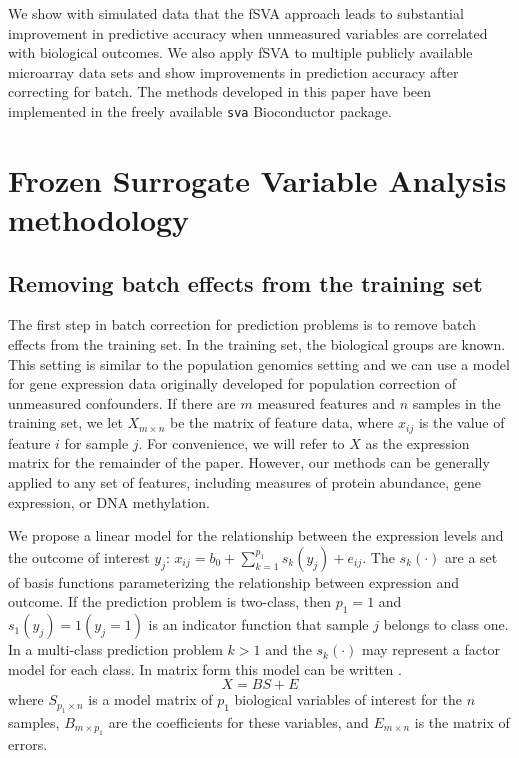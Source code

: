 \documentclass{bioinfo}
\begin{document}
We show with simulated data that the fSVA approach leads to substantial improvement in predictive accuracy when unmeasured variables are correlated with biological outcomes. We also apply fSVA to multiple publicly available microarray data sets and show improvements in prediction accuracy after correcting for batch. The methods developed in this paper have been implemented in the freely available \texttt{sva} Bioconductor package. 


\section{Frozen Surrogate Variable Analysis methodology}

\subsection{Removing batch effects from the training set}
The first step in batch correction for prediction problems is to remove batch effects from the training set. In the training set, the biological groups are known. This setting is similar to the population genomics setting and we can use a model for gene expression data originally developed for population correction of unmeasured confounders. If there are $m$ measured features and $n$ samples in the training set, we let $X_{m \times n}$ be the matrix of feature data, where $x_{ij}$ is the value of feature $i$ for sample $j$. For convenience, we will refer to $X$ as the expression matrix for the remainder of the paper. However, our methods can be generally applied to any set of features, including measures of protein abundance, gene expression, or DNA methylation. 

We propose a linear model for the relationship between the expression levels and the outcome of interest $y_j$: $x_{ij} = b_0 + \sum_{k=1}^{p_1} s_k(y_j) + e_{ij}$. The $s_k(\cdot)$ are a set of basis functions parameterizing the relationship between expression and outcome. If the prediction problem is two-class, then $p_1 =1$ and $s_1(y_j) = 1(y_j = 1)$ is an indicator function that sample $j$ belongs to class one. In a multi-class prediction problem $k > 1$ and the $s_k(\cdot)$ may represent a factor model for each class. In matrix form this model can be written \cite{Leek2007,Leek2008}. 
\begin{equation}
X = BS + E
\label{eqn_before_batch}
\end{equation}
where $S_{p_1 \times n}$ is a model matrix of $p_1$ biological variables of interest for the $n$ samples, $B_{m \times p_1}$ are the coefficients for these variables, and  $E_{m \times n}$ is the matrix of errors. 
\end{document}
